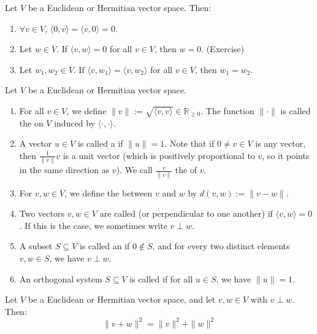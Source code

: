 \begin{lemma}
Let $V$ be a Euclidean or Hermitian vector space. Then:
\begin{enumerate}
    \item $\forall v \in V$, $\langle 0, v \rangle = \langle v, 0 \rangle = 0$.
    \item Let $w \in V$. If $\langle v, w \rangle = 0$ for all $v \in V$, then $w = 0$. (Exercise)
    \item Let $w_1, w_2 \in V$. If $\langle v, w_1 \rangle = \langle v, w_2 \rangle$ for all $v \in V$, then $w_1 = w_2$.
\end{enumerate}
\end{lemma}

\begin{definition}
\label{def:norm_distance_orthogonality}
Let $V$ be a Euclidean or Hermitian vector space.
\begin{enumerate}
    \item For all $v \in V$, we define $\|v\| := \sqrt{\langle v, v \rangle} \in \mathbb{R}_{\geq 0}$. The function $\| \cdot \|$ is called the  on $V$ induced by $\langle \cdot, \cdot \rangle$.
    \item A vector $u \in V$ is called a  if $\|u\| = 1$. Note that if $0 \neq v \in V$ is any vector, then $\frac{1}{\|v\|}v$ is a unit vector (which is positively proportional to $v$, so it points in the same direction as $v$). We call $\frac{v}{\|v\|}$ the  of $v$.
    \item For $v, w \in V$, we define the  between $v$ and $w$ by $d(v, w) := \|v - w\|$.
    \item Two vectors $v, w \in V$ are called  (or perpendicular to one another) if $\langle v, w \rangle = 0$. If this is the case, we sometimes write $v \perp w$.
    \item A subset $S \subseteq V$ is called an  if $0 \notin S$, and for every two distinct elements $v, w \in S$, we have $v \perp w$.
    \item An orthogonal system $S \subseteq V$ is called  if for all $u \in S$, we have $\|u\| = 1$.
\end{enumerate}
\end{definition}

\begin{theorem}
\label{thm:pythagoras}
Let $V$ be a Euclidean or Hermitian vector space, and let $v, w \in V$ with $v \perp w$. Then:
\[
    \|v + w\|^2 = \|v\|^2 + \|w\|^2
\]
\end{theorem}

